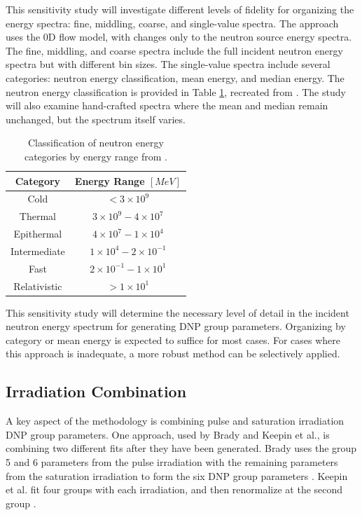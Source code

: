 This sensitivity study will investigate different levels of fidelity for organizing the energy spectra: fine, middling, coarse, and single-value spectra.
The approach uses the 0D flow model, with changes only to the neutron source energy spectra.
The fine, middling, and coarse spectra include the full incident neutron energy spectra but with different bin sizes.
The single-value spectra include several categories: neutron energy classification, mean energy, and median energy.
The neutron energy classification is provided in Table \ref{tab:neutronenergyspectra}, recreated from \cite{l2003nuclear}.
The study will also examine hand-crafted spectra where the mean and median remain unchanged, but the spectrum itself varies.

\begin{table}[H]
    \centering
    \caption{Classification of neutron energy categories by energy range from \cite{l2003nuclear}.}
    \begin{tabular}{cc}
    \hline
        Category & Energy Range $[MeV]$ \\
    \hline
      Cold   & $< 3 \times 10^9$ \\
      Thermal & $3 \times 10^9 - 4 \times 10^7$ \\
      Epithermal & $4 \times 10^7 - 1 \times 10^4$ \\
      Intermediate & $1 \times 10^4 - 2 \times 10^{-1}$ \\
      Fast & $2 \times 10^{-1} - 1 \times 10^1$ \\
      Relativistic & $> 1 \times 10^1$ \\
    \hline
    \end{tabular}
    \label{tab:neutronenergyspectra}
\end{table}

This sensitivity study will determine the necessary level of detail in the incident neutron energy spectrum for generating \gls{DNP} group parameters.
Organizing by category or mean energy is expected to suffice for most cases.
For cases where this approach is inadequate, a more robust method can be selectively applied.

\subsection{Irradiation Combination}
\label{sec:irrad-combine}
A key aspect of the methodology is combining pulse and saturation irradiation \gls{DNP} group parameters.
One approach, used by Brady and Keepin et al., is combining two different fits after they have been generated.
Brady uses the group 5 and 6 parameters from the pulse irradiation with the remaining parameters from the saturation irradiation to form the six \gls{DNP} group parameters \cite{brady1988evaluation}.
Keepin et al. fit four groups with each irradiation, and then renormalize at the second group \cite{keepin1957delayed}.

